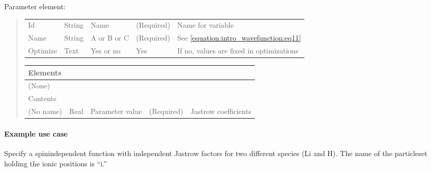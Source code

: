 \documentclass[letterpaper,10pt,english]{sphinxmanual}
\begin{document}
Parameter element:
\begin{quote}


\begin{savenotes}\sphinxattablestart
\centering
\begin{tabulary}{\linewidth}[t]{|T|T|T|T|T|}
\hline

&
&
&
&
\\
\hline
Id
&
String
&
Name
&
(Required)
&
Name for
variable
\\
\hline
Name
&
String
&
A or B or C
&
(Required)
&
See
\eqref{equation:intro_wavefunction:eq11}
\\
\hline
Optimize
&
Text
&
Yes or no
&
Yes
&
If no,
values are
fixed in
optimizations
\\
\hline
\end{tabulary}
\par
\sphinxattableend\end{savenotes}


\begin{savenotes}\sphinxattablestart
\centering
\begin{tabulary}{\linewidth}[t]{|T|T|T|T|T|}
\hline

Elements
&&&&\\
\hline
(None)
&&&&\\
\hline
Contents
&&&&\\
\hline
(No name)
&
Real
&
Parameter
value
&
(Required)
&
Jastrow
coefficients
\\
\hline
\end{tabulary}
\par
\sphinxattableend\end{savenotes}
\end{quote}


\paragraph{Example use case}
\label{\detokenize{intro_wavefunction:example-use-case}}\label{\detokenize{intro_wavefunction:bjpadeexamples}}
Specify a spin\sphinxhyphen{}independent function with independent Jastrow factors for two different species (Li and H).
The name of the particleset holding the ionic positions is “i.”
\end{document}
